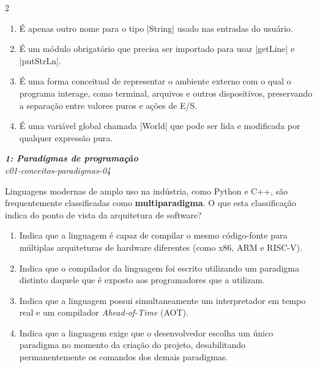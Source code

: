 \documentclass[a4paper,10pt,brazil]{article}
\begin{document}
\begin{multicols}{2}
\begin{enumerate}
  \item É apenas outro nome para o tipo \haskellinline|String| usado nas entradas do usuário.

  \item É um módulo obrigatório que precisa ser importado para usar \haskellinline|getLine| e \haskellinline|putStrLn|.

  \item É uma forma conceitual de representar o ambiente externo com o qual o programa interage, como terminal, arquivos e outros dispositivos, preservando a separação entre valores puros e ações de E/S.

  \item É uma variável global chamada \haskellinline|World| que pode ser lida e modificada por qualquer expressão pura.


\end{enumerate}

\begin{flushright}
  \footnotesize
  \textit{\textbf{1: Paradigmas de programação}}\\
  \textit{c01-conceitos-paradigmas-04}\\

\end{flushright}
Linguagens modernas de amplo uso na indústria, como Python e C++, são frequentemente classificadas como \textbf{multiparadigma}. O que esta classificação indica do ponto de vista da arquitetura de software?

\begin{enumerate}
  \item Indica que a linguagem é capaz de compilar o mesmo código-fonte para múltiplas arquiteturas de hardware diferentes (como x86, ARM e RISC-V).

  \item Indica que o compilador da linguagem foi escrito utilizando um paradigma distinto daquele que é exposto aos programadores que a utilizam.

  \item Indica que a linguagem possui simultaneamente um interpretador em tempo real e um compilador \emph{Ahead-of-Time} (AOT).

  \item Indica que a linguagem exige que o desenvolvedor escolha um único paradigma no momento da criação do projeto, desabilitando permanentemente os comandos dos demais paradigmas.


\end{enumerate}
\end{multicols}
\end{document}
